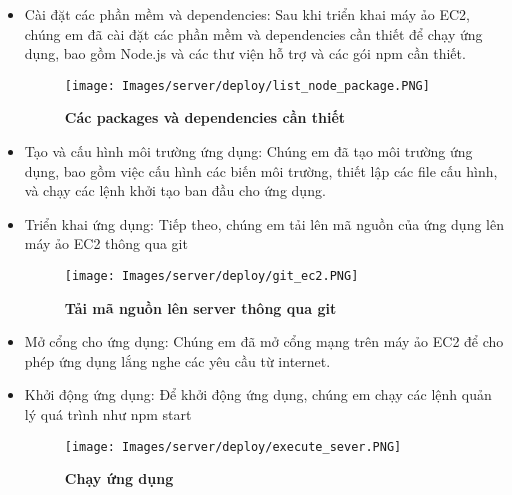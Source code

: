 \begin{itemize}
  \item Cài đặt các phần mềm và dependencies: Sau khi triển khai máy ảo EC2, chúng em đã cài đặt các phần mềm và dependencies cần thiết để chạy ứng dụng, bao gồm Node.js và các thư viện hỗ trợ và các gói npm cần thiết.
  


  \begin{figure}[H]
    \centering
    \texttt{[image: Images/server/deploy/list\_node\_package.PNG]}
    \caption[Các packages và dependencies cần thiết]{\bfseries \fontsize{12pt}{0pt}
    \selectfont Các packages và dependencies cần thiết}
    \label{ec2_dashboard} %
  \end{figure}


  \item Tạo và cấu hình môi trường ứng dụng: Chúng em đã tạo môi trường ứng dụng, bao gồm việc cấu hình các biến môi trường, thiết lập các file cấu hình, và chạy các lệnh khởi tạo ban đầu cho ứng dụng.
  \item Triển khai ứng dụng: Tiếp theo, chúng em tải lên mã nguồn của ứng dụng lên máy ảo EC2 thông qua git
  
  \begin{figure}[H]
    \centering
    \texttt{[image: Images/server/deploy/git\_ec2.PNG]}
    \caption[Tải mã nguồn lên server thông qua git]{\bfseries \fontsize{12pt}{0pt}
    \selectfont Tải mã nguồn lên server thông qua git}
    \label{ec2_dashboard} %
  \end{figure}

  \item Mở cổng cho ứng dụng: Chúng em đã mở cổng mạng trên máy ảo EC2 để cho phép ứng dụng lắng nghe các yêu cầu từ internet.
  \item Khởi động ứng dụng: Để khởi động ứng dụng, chúng em chạy các lệnh quản lý quá trình như npm start
  

  \begin{figure}[H]
    \centering
    \texttt{[image: Images/server/deploy/execute\_sever.PNG]}
    \caption[Chạy ứng dụng]{\bfseries \fontsize{12pt}{0pt}
    \selectfont Chạy ứng dụng}
    \label{execute_sever} %
  \end{figure}


\end{itemize}

